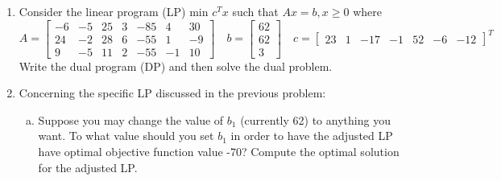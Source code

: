 \documentclass{article}
\begin{document}
\begin{enumerate}
\begin{enumerate}[a)]
			\item Show how the dual programs from part a, b, are equivalent.
				\begin{proof}
					In part a, the condition $-y_1\le 0$ means that $y_1\ge 0,$ so let $y_1=z_1\ge 0.$ Then we have $y_2\le 0$ so let $-y_2=z_2\ge 0.$ Then since $y_3$ is unrestricted, let $y_3=z_3-z_4,$ where $z_3, z_4\ge 0.$ Making these substitutions into the result from part a, we have
					\begin{align*}
						\max\quad 3z_1-7z_2+9z_3-9z_4 & \\
						\text{s.t.}\quad z_1-5z_2-2z_3+2z_4 &\le -4 \\
						3z_3+z_2+3z_3-3z_4 &\le 6 \\
						-3z_1-z_2-3z_3+3z_4 &\le -6 \\
						z_1, z_2, z_3, z_4 &\ge 0
					\end{align*} which is exactly the problem we obtained in part b.
					
				\end{proof}

		\end{enumerate}

	\item Consider the linear program (LP) min $c^T x$ such that $Ax=b, x\ge 0$ where \[A=\begin{bmatrix}
				-6 & -5 & 25 & 3 & -85 & 4 & 30 \\
				24 & -2 & 28 & 6 & -55 & 1 & -9 \\
				9 & -5 & 11 & 2 & -55 & -1 & 10
			\end{bmatrix}\quad b=\begin{bmatrix}
				62 \\ 62 \\ 3
			\end{bmatrix}\quad c=\begin{bmatrix}
				23 & 1 & -17 & -1 & 52 & -6 & -12
		\end{bmatrix}^T\]
		Write the dual program (DP) and then solve the dual problem.

	\item Concerning the specific LP discussed in the previous problem:

		\begin{enumerate}[a)]
			\item Suppose you may change the value of $b_1$ (currently 62) to anything you want. To what value should you set $b_1$ in order to have the adjusted LP have optimal objective function value -70? Compute the optimal solution for the adjusted LP.


\end{enumerate}
\end{enumerate}
\end{document}
